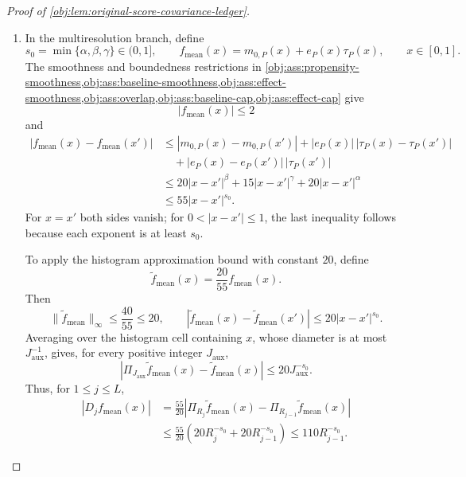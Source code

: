 \begin{proof}[Proof of \cref{obj:lem:original-score-covariance-ledger}]
\begin{enumerate}
The augmented kernel has singleton projection
\[
k_{r,u}^{(1)}(o)
=
\frac{h_{r,u}(o)-\mathbb E[h_{r,u}(O)]}{2}
+
g_{r,u}^{(1)}(o).
\]
Centering decreases second moment, so the triangle inequality in \(L_2(P)\) gives
\[
2\|k_{r,u}^{(1)}\|_{L_2(P)}
\le
\sqrt{\mathbb E[h_{r,u}(O)^2]}
+
2\sqrt{
\mathbb E\!\left[
\left\{\mathbb E[g_{r,u}(O,O')\mid O]\right\}^{2}
\right]}.
\]
Here
\[
\operatorname{Var}_P(k_{r,u}^{(1)})
=
\|k_{r,u}^{(1)}\|_{L_2(P)}^2
\]
because its mean is zero.

In the single-correction branch, the projection estimate with
\(J_{\mathrm{aux}}=K\) and \(T=T_0\) gives
\[
\mathbb E\!\left[
\left\{\mathbb E[g_{r,u}(O,O')\mid O]\right\}^{2}
\right]
\le B_{g,\mathrm{single}}^2\|u\|_2^2,
\qquad
B_{g,\mathrm{single}}=\sqrt{V_0}.
\]
It follows that
\[
4\operatorname{Var}_P(k_{r,u}^{(1)})
\le
(B_h+2B_{g,\mathrm{single}})^2\|u\|_2^2
=
(4\sqrt{V_0})^2\|u\|_2^2
\le
(16\sqrt{V_0})^2\|u\|_2^2
=
L_1^2\|u\|_2^2.
\]

\item In the multiresolution branch, define
\[
s_0=\min\{\alpha,\beta,\gamma\}\in(0,1],
\qquad
f_{\mathrm{mean}}(x)=m_{0,P}(x)+e_P(x)\tau_P(x),
\qquad x\in[0,1].
\]
The smoothness and boundedness restrictions in
\cref{obj:ass:propensity-smoothness,obj:ass:baseline-smoothness,obj:ass:effect-smoothness,obj:ass:overlap,obj:ass:baseline-cap,obj:ass:effect-cap}
give
\[
|f_{\mathrm{mean}}(x)|\le2
\]
and
\[
\begin{aligned}
|f_{\mathrm{mean}}(x)-f_{\mathrm{mean}}(x')|
&\le
|m_{0,P}(x)-m_{0,P}(x')|
+
|e_P(x)|\,|\tau_P(x)-\tau_P(x')|\\
&\quad+
|e_P(x)-e_P(x')|\,|\tau_P(x')|\\
&\le
20|x-x'|^\beta
+
15|x-x'|^\gamma
+
20|x-x'|^\alpha\\
&\le55|x-x'|^{s_0}.
\end{aligned}
\]
For \(x=x'\) both sides vanish; for \(0<|x-x'|\le1\), the last inequality follows because each exponent is at least \(s_0\).

To apply the histogram approximation bound with constant \(20\), define
\[
\widetilde f_{\mathrm{mean}}(x)=\frac{20}{55}f_{\mathrm{mean}}(x).
\]
Then
\[
\|\widetilde f_{\mathrm{mean}}\|_\infty\le\frac{40}{55}\le20,
\qquad
|\widetilde f_{\mathrm{mean}}(x)-\widetilde f_{\mathrm{mean}}(x')|
\le20|x-x'|^{s_0}.
\]
Averaging over the histogram cell containing \(x\), whose diameter is at most \(J_{\mathrm{aux}}^{-1}\), gives, for every positive integer \(J_{\mathrm{aux}}\),
\[
|\Pi_{J_{\mathrm{aux}}}\widetilde f_{\mathrm{mean}}(x)
-\widetilde f_{\mathrm{mean}}(x)|
\le20J_{\mathrm{aux}}^{-s_0}.
\]
Thus, for \(1\le j\le L\),
\[
\begin{aligned}
|D_jf_{\mathrm{mean}}(x)|
&=
\frac{55}{20}
\left|
\Pi_{R_j}\widetilde f_{\mathrm{mean}}(x)
-
\Pi_{R_{j-1}}\widetilde f_{\mathrm{mean}}(x)
\right|\\
&\le
\frac{55}{20}
\left(20R_j^{-s_0}+20R_{j-1}^{-s_0}\right)
\le110R_{j-1}^{-s_0}.
\end{aligned}
\]


\end{enumerate}
\end{proof}
